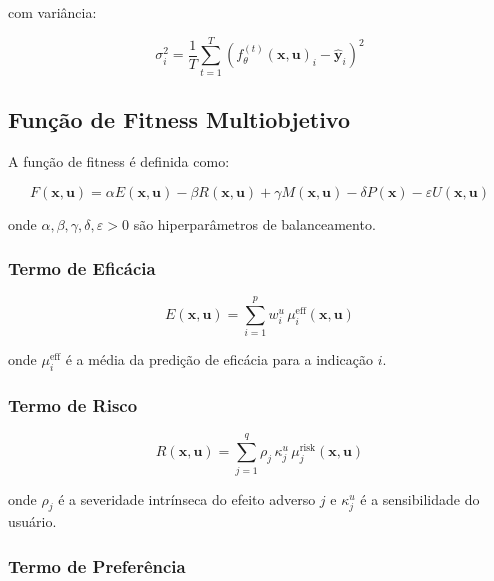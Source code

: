 \documentclass[12pt, a4paper]{article}
\begin{document}
com variância:

\begin{equation}
\sigma_i^2 = \frac{1}{T} \sum_{t=1}^T \left(f_\theta^{(t)}(\mathbf{x}, \mathbf{u})_i - \hat{\mathbf{y}}_i\right)^2
\end{equation}

\subsection{Função de Fitness Multiobjetivo}

A função de fitness é definida como:

\begin{equation}
F(\mathbf{x}, \mathbf{u}) = \alpha E(\mathbf{x}, \mathbf{u}) - \beta R(\mathbf{x}, \mathbf{u}) + \gamma M(\mathbf{x}, \mathbf{u}) - \delta P(\mathbf{x}) - \varepsilon U(\mathbf{x}, \mathbf{u})
\end{equation}

onde $\alpha, \beta, \gamma, \delta, \varepsilon > 0$ são hiperparâmetros de balanceamento.

\subsubsection{Termo de Eficácia}

\begin{equation}
E(\mathbf{x}, \mathbf{u}) = \sum_{i=1}^p w_i^u \, \mu_i^{\text{eff}}(\mathbf{x}, \mathbf{u})
\end{equation}

onde $\mu_i^{\text{eff}}$ é a média da predição de eficácia para a indicação $i$.

\subsubsection{Termo de Risco}

\begin{equation}
R(\mathbf{x}, \mathbf{u}) = \sum_{j=1}^q \rho_j \, \kappa_j^u \, \mu_j^{\text{risk}}(\mathbf{x}, \mathbf{u})
\end{equation}

onde $\rho_j$ é a severidade intrínseca do efeito adverso $j$ e $\kappa_j^u$ é a sensibilidade do usuário.

\subsubsection{Termo de Preferência}
\end{document}
